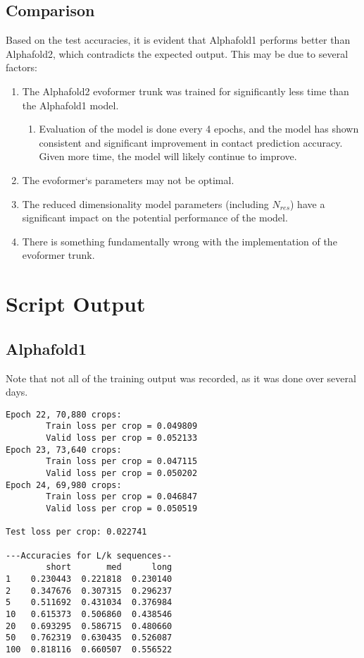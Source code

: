 \documentclass[11pt]{article}
\newcommand{\np}{\newpage}
\begin{document}
\subsection{Comparison}
Based on the test accuracies, it is evident that Alphafold1 performs better than Alphafold2, which contradicts the expected output.  This may be due to several factors:
\begin{enumerate}[label=(\arabic*)]
	\item The Alphafold2 evoformer trunk was trained for significantly less time than the Alphafold1 model.
    \begin{enumerate}[label=(\alph*)]
        \item Evaluation of the model is done every 4 epochs, and the model has shown consistent and significant improvement in contact prediction accuracy.  Given more time, the model will likely continue to improve.
    \end{enumerate}
	\item The evoformer`s parameters may not be optimal.
	\item The reduced dimensionality model parameters (including $N_{res}$) have a significant impact on the potential performance of the model.
	\item There is something fundamentally wrong with the implementation of the evoformer trunk.
\end{enumerate}
\np

\section{Script Output}
\subsection{Alphafold1}
Note that not all of the training output was recorded, as it was done over several days.

\begin{lstlisting}
Epoch 22, 70,880 crops:
        Train loss per crop = 0.049809
        Valid loss per crop = 0.052133
Epoch 23, 73,640 crops:
        Train loss per crop = 0.047115
        Valid loss per crop = 0.050202
Epoch 24, 69,980 crops:
        Train loss per crop = 0.046847
        Valid loss per crop = 0.050519

Test loss per crop: 0.022741

---Accuracies for L/k sequences--
        short       med      long
1    0.230443  0.221818  0.230140
2    0.347676  0.307315  0.296237
5    0.511692  0.431034  0.376984
10   0.615373  0.506860  0.438546
20   0.693295  0.586715  0.480660
50   0.762319  0.630435  0.526087
100  0.818116  0.660507  0.556522
\end{lstlisting}
\end{document}
